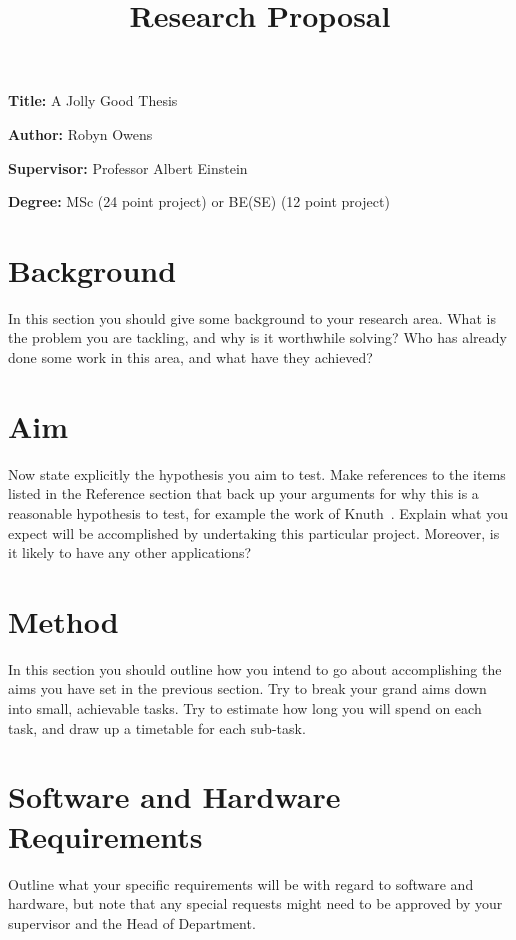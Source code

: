 \documentclass[12pt, a4paper]{article}
\title{Research Proposal}
\author{}
\date{}
\newcommand{\namelistlabel}[1]{\mbox{#1}\hfil}
\newenvironment{namelist}[1]{%
\begin{list}{}
    {
        \let\makelabel\namelistlabel
        \settowidth{\labelwidth}{#1}
        \setlength{\leftmargin}{1.1\labelwidth}
    }
  }{%
\end{list}}
\begin{document}
\maketitle

\begin{namelist}{xxxxxxxxxxxx}
\item[{\bf Title:}]
	A Jolly Good Thesis
\item[{\bf Author:}]
	Robyn Owens
\item[{\bf Supervisor:}]
	Professor Albert Einstein
\item[{\bf Degree:}]
	MSc (24 point project) or BE(SE) (12 point project)
\end{namelist}

\section*{Background} In this section you should give some background to your
research area. What is the problem you are tackling, and why is it
worthwhile solving? Who has already done some work in this area,
and what have they achieved?

\section*{Aim} Now state explicitly the hypothesis you aim to
test. Make references to the items listed in the Reference section
that back up your arguments for why this is a reasonable
hypothesis to test, for example the work of Knuth~\cite{knuth}.
Explain what you expect will be accomplished by undertaking this
particular project.  Moreover, is it likely to have any other
applications?
 
\section*{Method}
In this section you should outline how you intend to go
about accomplishing the aims you have set in the previous
section. Try to break your grand aims down into small,
achievable tasks. Try to estimate how long you will
spend on each task, and draw up a timetable for each
sub-task.

\section*{Software and Hardware Requirements}
Outline what your specific requirements will be with regard
to software and hardware, but note that any special requests
might need to be approved by your supervisor and the Head of
Department.
\end{document}
